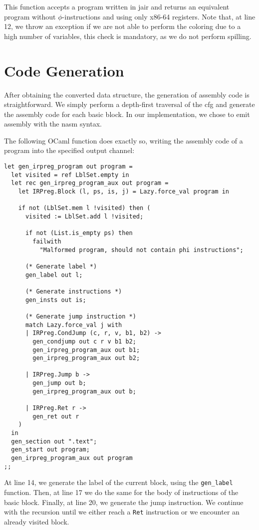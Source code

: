This function accepts a program written in \gls{jair} and returns an equivalent program without $\phi$-instructions and using only x86-64 registers.
Note that, at line 12, we throw an exception if we are not able to perform the coloring due to a high number of variables, this check is mandatory, as we do not perform spilling.

\section{Code Generation}
\label{sec:codegen}

After obtaining the converted data structure, the generation of assembly code is straightforward. We simply perform a depth-first traversal of the \gls{cfg} and generate the assembly code for each basic block.
In our implementation, we chose to emit assembly with the \gls{nasm} syntax.

The following OCaml function does exactly so, writing the assembly code of a program into the specified output channel:

\begin{lstlisting}[style=OCaml]
let gen_irpreg_program out program =
  let visited = ref LblSet.empty in
  let rec gen_irpreg_program_aux out program =
    let IRPreg.Block (l, ps, is, j) = Lazy.force_val program in

    if not (LblSet.mem l !visited) then (
      visited := LblSet.add l !visited;

      if not (List.is_empty ps) then
        failwith
          "Malformed program, should not contain phi instructions";

      (* Generate label *)
      gen_label out l;

      (* Generate instructions *)
      gen_insts out is;

      (* Generate jump instruction *)
      match Lazy.force_val j with
      | IRPreg.CondJump (c, r, v, b1, b2) ->
        gen_condjump out c r v b1 b2;
        gen_irpreg_program_aux out b1;
        gen_irpreg_program_aux out b2;

      | IRPreg.Jump b ->
        gen_jump out b;
        gen_irpreg_program_aux out b;

      | IRPreg.Ret r ->
        gen_ret out r
    )
  in
  gen_section out ".text";
  gen_start out program;
  gen_irpreg_program_aux out program
;;
\end{lstlisting}

At line 14, we generate the label of the current block, using the \texttt{gen\_label} function. Then, at line 17 we do the same for the body of instructions of the basic block. Finally, at line 20, we generate the jump instruction. We continue with the recursion until we either reach a \texttt{Ret} instruction or we encounter an already visited block.

